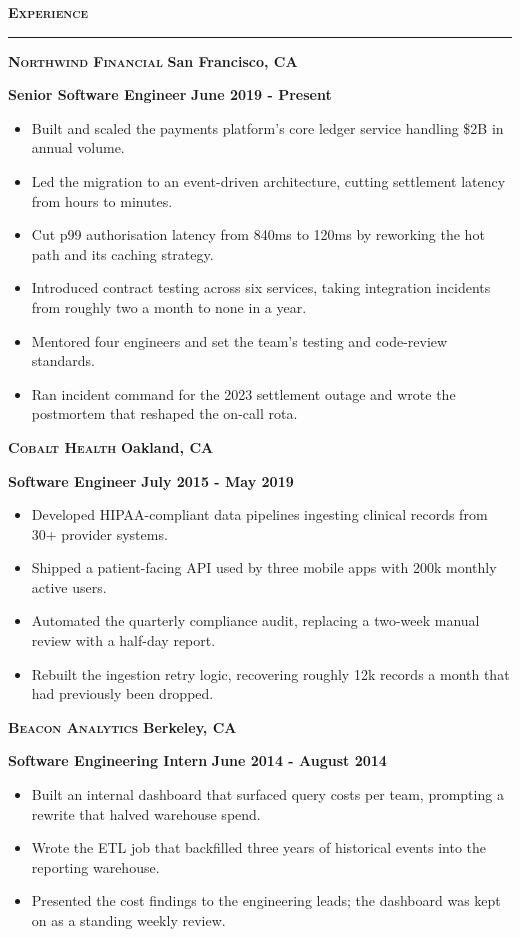 \documentclass{article}
\begin{document}
\noindent \textbf{\textsc{\large Experience}}

\noindent \rule[3pt]{\textwidth}{1pt}

\noindent \textbf{\textsc{Northwind Financial}} \hfill \textbf{San Francisco, CA}

\noindent \textbf{Senior Software Engineer} \hfill \textbf{June 2019 - Present}
\begin{itemize}
	\item Built and scaled the payments platform's core ledger service handling \$2B in annual volume.
	\item Led the migration to an event-driven architecture, cutting settlement latency from hours to minutes.
	\item Cut p99 authorisation latency from 840ms to 120ms by reworking the hot path and its caching strategy.
	\item Introduced contract testing across six services, taking integration incidents from roughly two a month to none in a year.
	\item Mentored four engineers and set the team's testing and code-review standards.
	\item Ran incident command for the 2023 settlement outage and wrote the postmortem that reshaped the on-call rota.
\end{itemize}

\noindent \textbf{\textsc{Cobalt Health}} \hfill \textbf{Oakland, CA}

\noindent \textbf{Software Engineer} \hfill \textbf{July 2015 - May 2019}
\begin{itemize}
	\item Developed HIPAA-compliant data pipelines ingesting clinical records from 30+ provider systems.
	\item Shipped a patient-facing API used by three mobile apps with 200k monthly active users.
	\item Automated the quarterly compliance audit, replacing a two-week manual review with a half-day report.
	\item Rebuilt the ingestion retry logic, recovering roughly 12k records a month that had previously been dropped.
\end{itemize}

\noindent \textbf{\textsc{Beacon Analytics}} \hfill \textbf{Berkeley, CA}

\noindent \textbf{Software Engineering Intern} \hfill \textbf{June 2014 - August 2014}
\begin{itemize}
	\item Built an internal dashboard that surfaced query costs per team, prompting a rewrite that halved warehouse spend.
	\item Wrote the ETL job that backfilled three years of historical events into the reporting warehouse.
	\item Presented the cost findings to the engineering leads; the dashboard was kept on as a standing weekly review.
\end{itemize}
\end{document}
